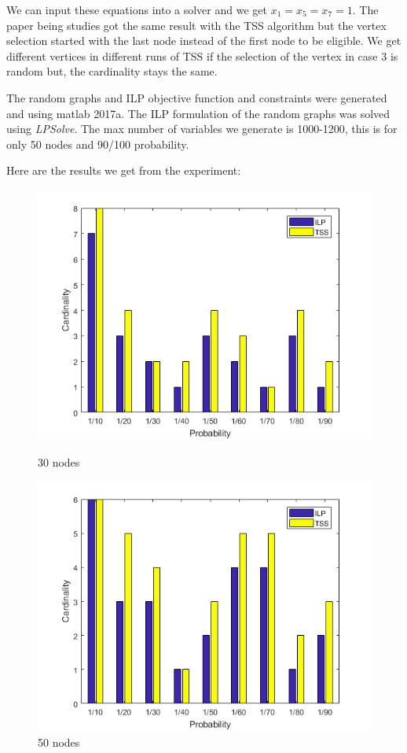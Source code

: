 We can input these equations into a solver and we get $x_{1}=x_{5}=x_{7}=1$. The paper being studies got the same result with the TSS algorithm but the vertex selection started with the last node instead of the first node to be eligible. We get different vertices in different runs of TSS if the selection of the vertex in case 3 is random but, the cardinality stays the same.

The random graphs and ILP objective function and constraints were generated and using matlab 2017a. The ILP formulation of the random graphs was solved using \textit{LPSolve}\cite{lpsolve}. The max number of variables we generate is 1000-1200, this is for only 50 nodes and 90/100 probability.

Here are the results we get from the experiment:

\begin{figure}[h!]
\begin{minipage}[t]{0.50\textwidth}
\includegraphics[width=\linewidth,keepaspectratio=true]{images/rand30result.png}
\caption{30 nodes}

\end{minipage}
\begin{minipage}[t]{0.50\textwidth}
\includegraphics[width=\linewidth,keepaspectratio=true]{images/rand50result.png}
\caption{50 nodes}
\end{minipage}
\end{figure}

